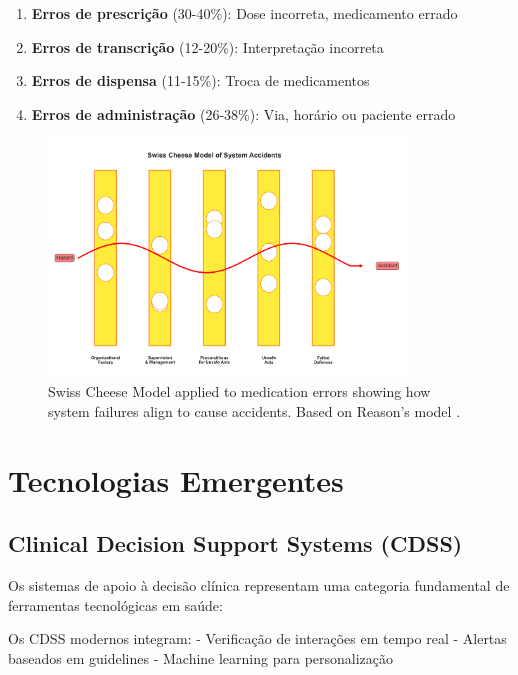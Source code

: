 \begin{enumerate}
    \item \textbf{Erros de prescrição} (30-40\%): Dose incorreta, medicamento errado \cite{isaacs2021}
    \item \textbf{Erros de transcrição} (12-20\%): Interpretação incorreta \cite{manias2021}
    \item \textbf{Erros de dispensa} (11-15\%): Troca de medicamentos \cite{kallio2020}
    \item \textbf{Erros de administração} (26-38\%): Via, horário ou paciente errado \cite{boytim2018}
\end{enumerate}

\begin{figure}[htbp]
    \centering
    \includegraphics[width=0.85\textwidth]{images/generated/swiss_cheese_model.png}
    \caption{Swiss Cheese Model applied to medication errors showing how system failures align to cause accidents. Based on Reason's model \citep{ciapponi2021,mulac2020}.}
    \label{fig:swiss_cheese}
\end{figure}

\section{Tecnologias Emergentes}

\subsection{Clinical Decision Support Systems (CDSS)}

Os sistemas de apoio à decisão clínica \cite{moss2015,belle2013} representam uma categoria fundamental de ferramentas tecnológicas em saúde:

Os CDSS modernos integram:
- Verificação de interações em tempo real
- Alertas baseados em guidelines
- Machine learning \cite{bates2021,zhao2021} para personalização

